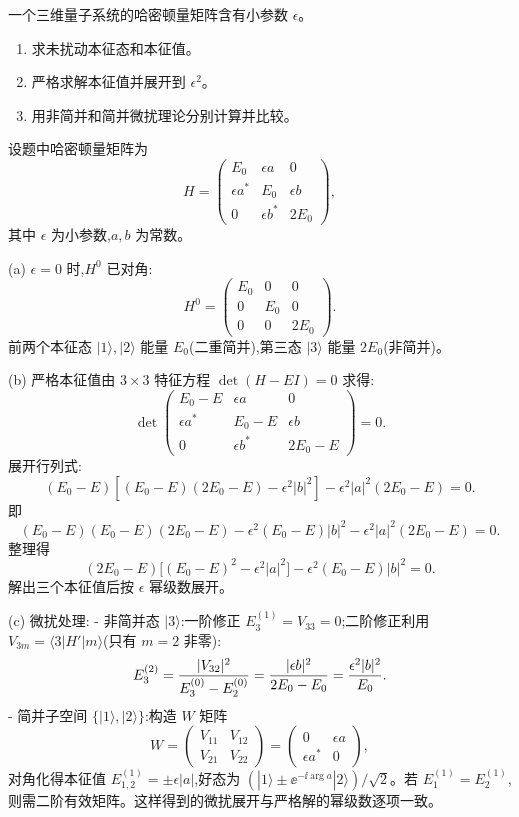 \begin{question}
一个三维量子系统的哈密顿量矩阵含有小参数 $\epsilon$。
\begin{enumerate}
\item 求未扰动本征态和本征值。
\item 严格求解本征值并展开到 $\epsilon^2$。
\item 用非简并和简并微扰理论分别计算并比较。
\end{enumerate}
\end{question}
\begin{solution}
设题中哈密顿量矩阵为
\[
H=\begin{pmatrix}
E_0 & \epsilon a & 0\\
\epsilon a^* & E_0 & \epsilon b\\
0 & \epsilon b^* & 2E_0
\end{pmatrix},
\]
其中 $\epsilon$ 为小参数,$a,b$ 为常数。

(a) $\epsilon=0$ 时,$H^0$ 已对角:
\[
H^0=\begin{pmatrix}
E_0 & 0 & 0\\
0 & E_0 & 0\\
0 & 0 & 2E_0
\end{pmatrix}.
\]
前两个本征态 $|1\rangle,|2\rangle$ 能量 $E_0$(二重简并),第三态 $|3\rangle$ 能量 $2E_0$(非简并)。

(b) 严格本征值由 $3\times3$ 特征方程 $\det(H-EI)=0$ 求得:
\[
\det\begin{pmatrix}
E_0-E & \epsilon a & 0\\
\epsilon a^* & E_0-E & \epsilon b\\
0 & \epsilon b^* & 2E_0-E
\end{pmatrix}=0.
\]
展开行列式:
\[
(E_0-E)[(E_0-E)(2E_0-E)-\epsilon^2|b|^2]-\epsilon^2|a|^2(2E_0-E)=0.
\]
即
\[
(E_0-E)(E_0-E)(2E_0-E)-\epsilon^2(E_0-E)|b|^2-\epsilon^2|a|^2(2E_0-E)=0.
\]
整理得
\[
(2E_0-E)\bigl[(E_0-E)^2-\epsilon^2|a|^2\bigr]-\epsilon^2(E_0-E)|b|^2=0.
\]
解出三个本征值后按 $\epsilon$ 幂级数展开。

(c) 微扰处理:
- 非简并态 $|3\rangle$:一阶修正 $E_3^{(1)}=V_{33}=0$;二阶修正利用 $V_{3m}=\langle3|H'|m\rangle$(只有 $m=2$ 非零):
\[
E_3^{(2)}={|V_{32}|^2\over E_3^{(0)}-E_2^{(0)}}
={|\epsilon b|^2\over 2E_0-E_0}={\epsilon^2|b|^2\over E_0}.
\]
- 简并子空间 $\{|1\rangle,|2\rangle\}$:构造 $W$ 矩阵
\[
W=\begin{pmatrix}
V_{11} & V_{12}\\
V_{21} & V_{22}
\end{pmatrix}
=\begin{pmatrix}
0 & \epsilon a\\
\epsilon a^* & 0
\end{pmatrix},
\]
对角化得本征值 $E_{1,2}^{(1)}=\pm\epsilon|a|$,好态为 $(|1\rangle\pm \ee^{-\ii\arg a}|2\rangle)/\sqrt2$。若 $E_1^{(1)}=E_2^{(1)}$,则需二阶有效矩阵。这样得到的微扰展开与严格解的幂级数逐项一致。
\end{solution}

